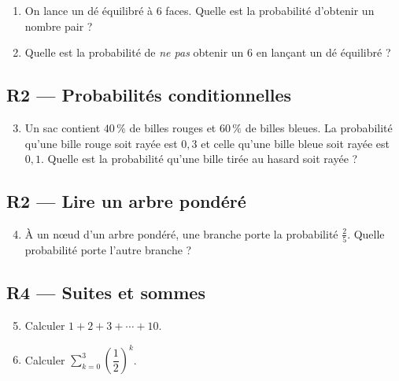 \begin{enumerate}

  \item On lance un dé équilibré à $6$ faces. Quelle est la probabilité d'obtenir un nombre pair ?

  \item Quelle est la probabilité de \emph{ne pas} obtenir un $6$ en lançant un dé équilibré ?

\end{enumerate}

\subsection*{R2 — Probabilités conditionnelles}

\begin{enumerate}
  \setcounter{enumi}{2}

  \item Un sac contient $40\,\%$ de billes rouges et $60\,\%$ de billes bleues. La probabilité qu'une bille rouge soit rayée est $0{,}3$ et celle qu'une bille bleue soit rayée est $0{,}1$. Quelle est la probabilité qu'une bille tirée au hasard soit rayée ?

\end{enumerate}

\subsection*{R2 — Lire un arbre pondéré}

\begin{enumerate}
  \setcounter{enumi}{3}

  \item À un nœud d'un arbre pondéré, une branche porte la probabilité $\frac{2}{5}$. Quelle probabilité porte l'autre branche ?

\end{enumerate}

\subsection*{R4 — Suites et sommes}

\begin{enumerate}
  \setcounter{enumi}{4}

  \item Calculer $1 + 2 + 3 + \cdots + 10$.

  \item Calculer $\displaystyle\sum_{k=0}^{3} \left(\dfrac{1}{2}\right)^k$.

\end{enumerate}

